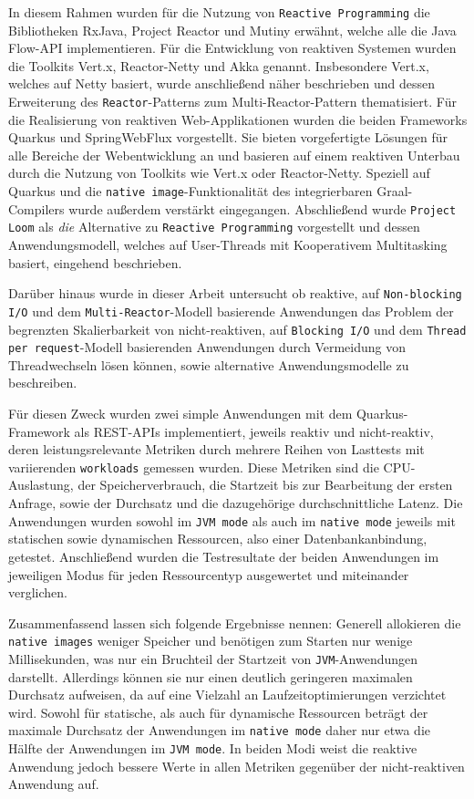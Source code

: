 In diesem Rahmen wurden für die Nutzung von \verb|Reactive Programming| die Bibliotheken RxJava, Project Reactor und Mutiny erwähnt, welche
alle die Java Flow-API implementieren. Für die Entwicklung von reaktiven Systemen wurden die Toolkits Vert.x, Reactor-Netty und Akka
genannt. Insbesondere Vert.x, welches auf Netty basiert, wurde anschließend näher beschrieben und dessen Erweiterung des \verb|Reactor|-Patterns
zum Multi-Reactor-Pattern thematisiert. Für die Realisierung von reaktiven Web-Applikationen wurden die beiden Frameworks Quarkus und
SpringWebFlux vorgestellt.
Sie bieten vorgefertigte Lösungen für alle Bereiche der Webentwicklung an und basieren auf einem reaktiven Unterbau durch die Nutzung
von Toolkits wie Vert.x oder Reactor-Netty. Speziell auf Quarkus und die \verb|native image|-Funktionalität des integrierbaren Graal-Compilers
wurde außerdem verstärkt eingegangen.
Abschließend wurde \verb|Project Loom| als \textit{die} Alternative zu \verb|Reactive Programming| vorgestellt und dessen Anwendungsmodell, welches
auf User-Threads mit Kooperativem Multitasking basiert, eingehend beschrieben.\newline

Darüber hinaus wurde in dieser Arbeit untersucht ob reaktive, auf \verb|Non-blocking I/O| und dem \verb|Multi-Reactor|-Modell basierende
Anwendungen das Problem der begrenzten Skalierbarkeit von nicht-reaktiven, auf \verb|Blocking I/O| und dem \verb|Thread per request|-Modell
basierenden Anwendungen durch Vermeidung von Threadwechseln lösen können, sowie alternative Anwendungsmodelle zu beschreiben.

Für diesen Zweck wurden zwei simple Anwendungen mit dem Quarkus-Framework als REST-APIs implementiert, jeweils reaktiv und nicht-reaktiv, deren
leistungsrelevante Metriken durch mehrere Reihen von Lasttests mit variierenden \verb|workloads| gemessen wurden.
Diese Metriken sind die CPU-Auslastung, der Speicherverbrauch, die Startzeit bis zur Bearbeitung der ersten Anfrage,
sowie der Durchsatz und die dazugehörige durchschnittliche Latenz.
Die Anwendungen wurden sowohl im \verb|JVM mode| als auch im \verb|native mode| jeweils mit statischen sowie dynamischen
Ressourcen, also einer Datenbankanbindung, getestet.
Anschließend wurden die Testresultate der beiden Anwendungen im jeweiligen Modus für jeden Ressourcentyp ausgewertet und
miteinander verglichen.\newline

Zusammenfassend lassen sich folgende Ergebnisse nennen:
Generell allokieren die \verb|native images| weniger Speicher und benötigen zum Starten nur wenige Millisekunden, was nur ein Bruchteil der Startzeit
von \verb|JVM|-Anwendungen darstellt. Allerdings können sie nur einen deutlich
geringeren maximalen Durchsatz aufweisen, da auf eine Vielzahl an Laufzeitoptimierungen verzichtet wird.
Sowohl für statische, als auch für dynamische Ressourcen beträgt der maximale Durchsatz der Anwendungen im \verb|native mode|
daher nur etwa die Hälfte der Anwendungen im \verb|JVM mode|.
In beiden Modi weist die reaktive Anwendung jedoch bessere Werte in allen Metriken gegenüber der nicht-reaktiven Anwendung auf.

